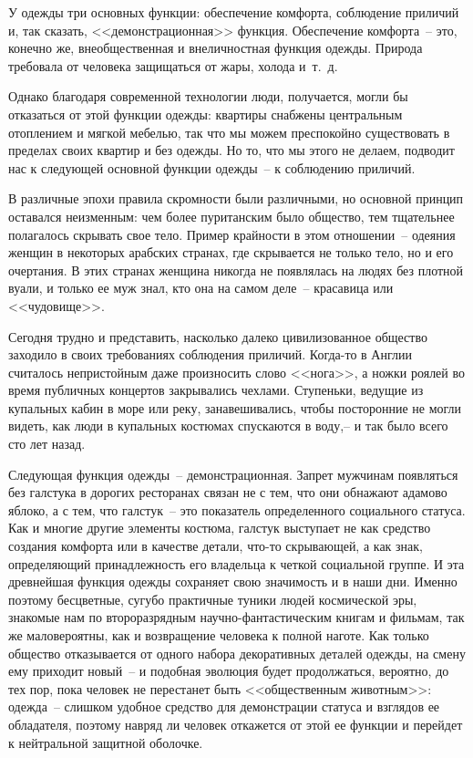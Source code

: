   У одежды три основных функции: обеспечение комфорта, соблюдение приличий и,
  так сказать, <<демонстрационная>> функция. Обеспечение комфорта~-- это,
  конечно же, внеобщественная и внеличностная функция одежды. Природа требовала
  от человека защищаться от жары, холода и~т.~д.
  
  Однако благодаря современной технологии люди, получается, могли бы отказаться
  от этой функции одежды: квартиры снабжены центральным отоплением и мягкой
  мебелью, так что мы можем преспокойно существовать в пределах своих квартир и
  без одежды. Но то, что мы этого не делаем, подводит нас к следующей основной
  функции одежды~-- к соблюдению приличий.
  
  В различные эпохи правила скромности были различными, но основной принцип
  оставался неизменным: чем более пуританским было общество, тем тщательнее
  полагалось скрывать свое тело. Пример крайности в этом отношении~-- одеяния
  женщин в некоторых арабских странах, где скрывается не только тело, но и
  его очертания. В этих странах женщина никогда не появлялась на людях без
  плотной вуали, и только ее муж знал, кто она на самом деле~-- красавица или
  <<чудовище>>.
  
  Сегодня трудно и представить, насколько далеко цивилизованное общество
  заходило в своих требованиях соблюдения приличий. Когда-то в Англии
  считалось непристойным даже произносить слово <<нога>>, а ножки роялей во
  время публичных концертов закрывались чехлами. Ступеньки, ведущие из
  купальных кабин в море или реку, занавешивались, чтобы посторонние не могли
  видеть, как люди в купальных костюмах спускаются в воду,-- и так было всего
  сто лет назад.
  
  Следующая функция одежды~-- демонстрационная. Запрет мужчинам появляться без
  галстука в дорогих ресторанах связан не с тем, что они обнажают адамово
  яблоко, а с тем, что галстук~-- это показатель определенного социального
  статуса. Как и многие другие элементы костюма, галстук выступает не как
  средство создания комфорта или в качестве детали, что-то скрывающей, а как
  знак, определяющий принадлежность его владельца к четкой социальной группе.
  И эта древнейшая функция одежды сохраняет свою значимость и в наши дни.
  Именно поэтому бесцветные, сугубо практичные туники людей космической эры,
  знакомые нам по второразрядным научно-фантастическим книгам и фильмам, так же
  маловероятны, как и возвращение человека к полной наготе. Как только общество
  отказывается от одного набора декоративных деталей одежды, на смену ему
  приходит новый~-- и подобная эволюция будет продолжаться, вероятно, до тех
  пор, пока человек не перестанет быть <<общественным животным>>: одежда~--
  слишком удобное средство для демонстрации статуса и взглядов ее обладателя,
  поэтому навряд ли человек откажется от этой ее функции и перейдет к
  нейтральной защитной оболочке.
  
